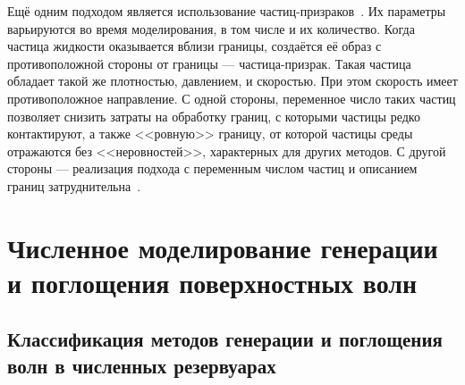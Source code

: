 Ещё одним подходом является использование частиц-призраков~\cite{Randles1996,Crespo2007}. 
Их параметры варьируются во время моделирования, в том числе и их количество.
Когда частица жидкости оказывается вблизи границы, создаётся её образ с противоположной стороны от границы --- частица-призрак.
Такая частица обладает такой же плотностью, давлением, и скоростью. При этом скорость имеет противоположное направление.
С одной стороны, переменное число таких частиц позволяет снизить затраты на обработку границ, с которыми частицы редко контактируют,
а также <<ровную>> границу, от которой частицы среды отражаются без <<неровностей>>, характерных для других методов.
С другой стороны --- реализация подхода с переменным числом частиц и описанием границ затруднительна~\cite{Liu2016}.


\section{Численное моделирование генерации и поглощения поверхностных волн}

\subsection{Классификация методов генерации и поглощения волн в численных резервуарах}

